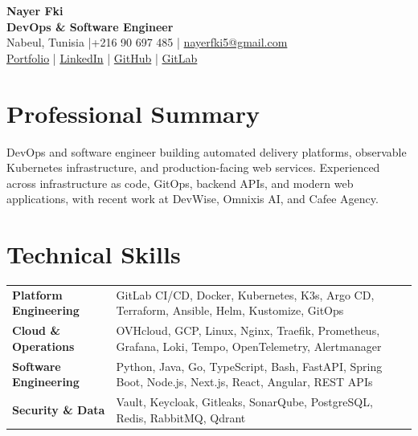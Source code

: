 \documentclass[9pt,a4paper]{extarticle}
\begin{document}
\fontsize{9.4}{10.8}\selectfont

\begin{center}
  {\fontsize{20}{22}\selectfont\bfseries\color{navy} Nayer Fki}\\[1pt]
  {\normalsize\bfseries DevOps \& Software Engineer}\\[2pt]
  Nabeul, Tunisia \enspace|\enspace +216 90 697 485 \enspace|\enspace
  \href{mailto:nayerfki5@gmail.com}{nayerfki5@gmail.com}\\[2pt]
  \textcolor{navy}{\href{https://portfolio-nayer.vercel.app}{Portfolio}} \enspace|\enspace
  \textcolor{navy}{\href{https://www.linkedin.com/in/nayer-fki}{LinkedIn}} \enspace|\enspace
  \textcolor{navy}{\href{https://github.com/nayer-fki}{GitHub}} \enspace|\enspace
  \textcolor{navy}{\href{https://gitlab.com/nayer-fki}{GitLab}}
\end{center}

\section*{Professional Summary}
DevOps and software engineer building automated delivery platforms, observable Kubernetes infrastructure, and production-facing web services. Experienced across infrastructure as code, GitOps, backend APIs, and modern web applications, with recent work at DevWise, Omnixis AI, and Cafee Agency.

\section*{Technical Skills}
\renewcommand{\arraystretch}{1.08}
\begin{tabularx}{\linewidth}{@{}>{\bfseries}l X@{}}
Platform Engineering & GitLab CI/CD, Docker, Kubernetes, K3s, Argo CD, Terraform, Ansible, Helm, Kustomize, GitOps \\
Cloud \& Operations & OVHcloud, GCP, Linux, Nginx, Traefik, Prometheus, Grafana, Loki, Tempo, OpenTelemetry, Alertmanager \\
Software Engineering & Python, Java, Go, TypeScript, Bash, FastAPI, Spring Boot, Node.js, Next.js, React, Angular, REST APIs \\
Security \& Data & Vault, Keycloak, Gitleaks, SonarQube, PostgreSQL, Redis, RabbitMQ, Qdrant \\
\end{tabularx}
\renewcommand{\arraystretch}{1}
\end{document}
